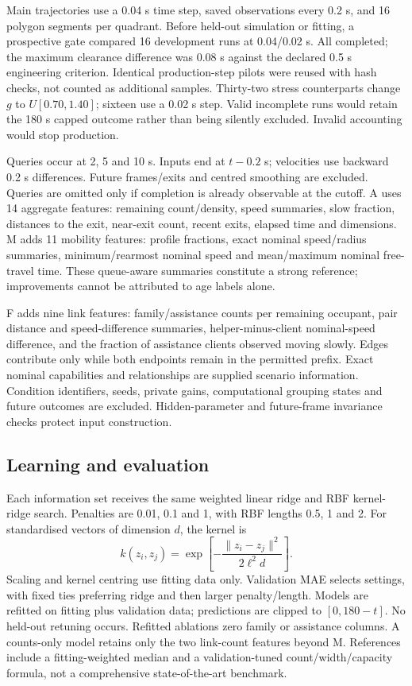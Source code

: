 \documentclass[conference]{IEEEtran}
\begin{document}
Main trajectories use a 0.04 s time step, saved observations every 0.2 s, and 16 polygon segments per quadrant. Before held-out simulation or fitting, a prospective gate compared 16 development runs at 0.04/0.02 s. All completed; the maximum clearance difference was 0.08 s against the declared 0.5 s engineering criterion. Identical production-step pilots were reused with hash checks, not counted as additional samples. Thirty-two stress counterparts change $g$ to $U[0.70,1.40]$; sixteen use a 0.02 s step. Valid incomplete runs would retain the 180 s capped outcome rather than being silently excluded. Invalid accounting would stop production.

Queries occur at 2, 5 and 10 s. Inputs end at $t-0.2$ s; velocities use backward 0.2 s differences. Future frames/exits and centred smoothing are excluded. Queries are omitted only if completion is already observable at the cutoff. A uses 14 aggregate features: remaining count/density, speed summaries, slow fraction, distances to the exit, near-exit count, recent exits, elapsed time and dimensions. M adds 11 mobility features: profile fractions, exact nominal speed/radius summaries, minimum/rearmost nominal speed and mean/maximum nominal free-travel time. These queue-aware summaries constitute a strong reference; improvements cannot be attributed to age labels alone.

F adds nine link features: family/assistance counts per remaining occupant, pair distance and speed-difference summaries, helper-minus-client nominal-speed difference, and the fraction of assistance clients observed moving slowly. Edges contribute only while both endpoints remain in the permitted prefix. Exact nominal capabilities and relationships are supplied scenario information. Condition identifiers, seeds, private gains, computational grouping states and future outcomes are excluded. Hidden-parameter and future-frame invariance checks protect input construction.

\subsection{Learning and evaluation}
Each information set receives the same weighted linear ridge and RBF kernel-ridge search. Penalties are 0.01, 0.1 and 1, with RBF lengths 0.5, 1 and 2. For standardised vectors of dimension $d$, the kernel is
\begin{equation}
k(z_i,z_j)=\exp\!\left[-\frac{\|z_i-z_j\|^2}{2\ell^2d}\right].
\end{equation}
Scaling and kernel centring use fitting data only. Validation MAE selects settings, with fixed ties preferring ridge and then larger penalty/length. Models are refitted on fitting plus validation data; predictions are clipped to $[0,180-t]$. No held-out retuning occurs. Refitted ablations zero family or assistance columns. A counts-only model retains only the two link-count features beyond M. References include a fitting-weighted median and a validation-tuned count/width/capacity formula, not a comprehensive state-of-the-art benchmark.
\end{document}
